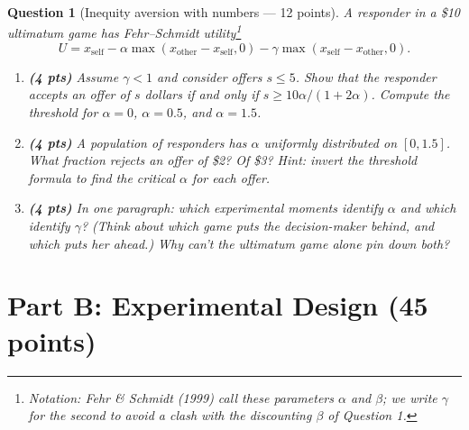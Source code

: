 \documentclass[11pt]{article}
\newtheorem{question}{Question}
\begin{document}
\begin{question}[Inequity aversion with numbers --- 12 points]
A responder in a \$10 ultimatum game has Fehr--Schmidt utility\footnote{%
Notation: Fehr \& Schmidt (1999) call these parameters $\alpha$ and
$\beta$; we write $\gamma$ for the second to avoid a clash with the
discounting $\beta$ of Question 1.}
\[
  U = x_{\text{self}} - \alpha \max(x_{\text{other}} - x_{\text{self}}, 0)
      - \gamma \max(x_{\text{self}} - x_{\text{other}}, 0).
\]

\begin{enumerate}[label=(\alph*)]
  \item \textbf{(4 pts)} Assume $\gamma < 1$ and consider offers
        $s \le 5$. Show that the responder accepts an offer of $s$
        dollars if and only if $s \ge 10\alpha / (1 + 2\alpha)$. Compute the
        threshold for $\alpha = 0$, $\alpha = 0.5$, and $\alpha = 1.5$.
  \item \textbf{(4 pts)} A population of responders has $\alpha$ uniformly
        distributed on $[0, 1.5]$. What fraction rejects an offer of \$2?
        Of \$3? \emph{Hint: invert the threshold formula to find the
        critical $\alpha$ for each offer.}
  \item \textbf{(4 pts)} In one paragraph: which experimental moments
        identify $\alpha$ and which identify $\gamma$? (Think about which
        game puts the decision-maker \emph{behind}, and which puts her
        \emph{ahead}.) Why can't the ultimatum game alone pin down both?
\end{enumerate}
\end{question}

\section*{Part B: Experimental Design (45 points)}
\end{document}
